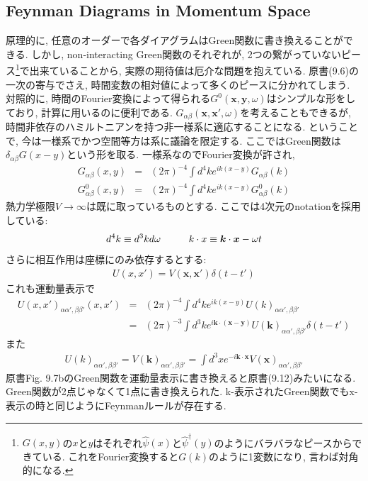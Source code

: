 \documentclass[10.5pt,a4paper]{jreport}
\newcommand{\bx}{\bm{x}}
\newcommand{\by}{\bm{y}}
\newcommand{\bk}{\bm{k}}
\newcommand{\hpsi}{\hat{\psi}}
\begin{document}
\subsection{Feynman Diagrams in Momentum Space}
原理的に, 任意のオーダーで各ダイアグラムはGreen関数に書き換えることができる. しかし, non-interacting Green関数のそれぞれが, 2つの繋がっていないピース\footnote{$G(x, y)$の$x$と$y$はそれぞれ$\hpsi(x)$と$\hpsi^\dagger(y)$のようにバラバラなピースからできている. これをFourier変換すると$G(k)$のように1変数になり, 言わば対角的になる. }で出来ていることから, 実際の期待値は厄介な問題を抱えている. 原書(9.6)の一次の寄与でさえ, 時間変数の相対値によって多くのピースに分かれてしまう. 対照的に, 時間のFourier変換によって得られる$G^0(\bx, \by, \omega)$はシンプルな形をしており, 計算に用いるのに便利である. $G_{\alpha\beta}(\bx, \bx', \omega)$を考えることもできるが, 時間非依存のハミルトニアンを持つ非一様系に適応することになる. ということで, 今は一様系でかつ空間等方は系に議論を限定する. ここではGreen関数は$\delta_{\alpha\beta}G(x-y)$という形を取る. 一様系なのでFourier変換が許され,
\begin{eqnarray}
  G_{\alpha\beta}(x, y) &=& (2\pi)^{-4}\int d^4ke^{ik(x-y)}G_{\alpha\beta}(k)\\
  G^0_{\alpha\beta}(x, y) &=& (2\pi)^{-4}\int d^4ke^{ik(x-y)}G^0_{\alpha\beta}(k)
\end{eqnarray}
熱力学極限$V\rightarrow\infty$は既に取っているものとする. ここでは4次元のnotationを採用している:
\begin{eqnarray}
  d^4k \equiv d^3kd\omega\hspace{1.0cm}k\cdot x \equiv \bk\cdot\bx - \omega t
\end{eqnarray}
さらに相互作用は座標にのみ依存するとする:
\begin{eqnarray}
  U(x, x') = V(\bx, \bx')\delta(t-t')
\end{eqnarray}
これも運動量表示で
\begin{eqnarray}
\nonumber  U(x, x')_{\alpha\alpha', \beta\beta'}(x, x') &=& (2\pi)^{-4}\int d^4ke^{ik(x-y)}U(k)_{\alpha\alpha', \beta\beta'}\\
  &=& (2\pi)^{-3}\int d^3ke^{i\bk\cdot(\bx-\by)}U(\bk)_{\alpha\alpha', \beta\beta'}\delta(t-t')
\end{eqnarray}
また
\begin{eqnarray}
  U(k)_{\alpha\alpha', \beta\beta'} = V(\bk)_{\alpha\alpha', \beta\beta'} = \int d^3xe^{-i\bk\cdot\bx}V(\bx)_{\alpha\alpha', \beta\beta'}
\end{eqnarray}
原書Fig. 9.7bのGreen関数を運動量表示に書き換えると原書(9.12)みたいになる. Green関数が2点じゃなくて1点に書き換えられた. k-表示されたGreen関数でもx-表示の時と同じようにFeynmanルールが存在する.
\end{document}
